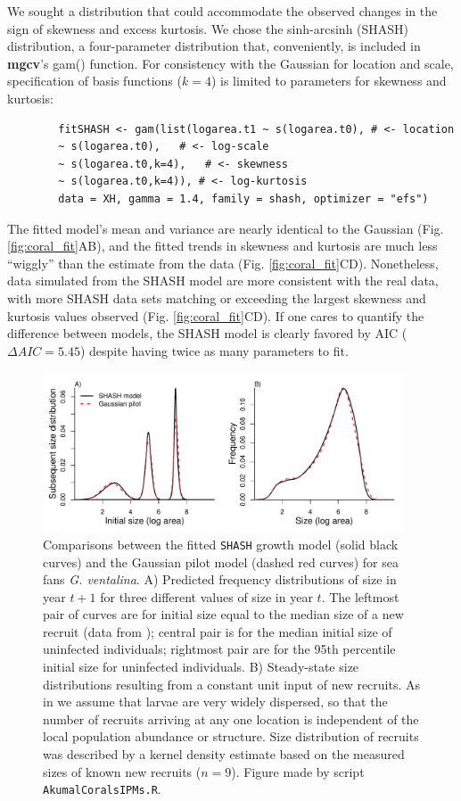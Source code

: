 \documentclass[12pt]{article}
\begin{document}
\begin{spacing}{1.35}
	We sought a distribution that could accommodate the observed changes in the sign of skewness and excess kurtosis. We chose the sinh-arcsinh (SHASH) distribution, a four-parameter distribution that, 
	conveniently, is included in \textbf{mgcv}'s gam() function. 
	For consistency with the Gaussian for location and scale, specification of basis functions ($k=4$) is limited to parameters for skewness and kurtosis:
	\begin{lstlisting}
		fitSHASH <- gam(list(logarea.t1 ~ s(logarea.t0), # <- location 
		~ s(logarea.t0),   # <- log-scale
		~ s(logarea.t0,k=4),   # <- skewness
		~ s(logarea.t0,k=4)), # <- log-kurtosis
		data = XH, gamma = 1.4, family = shash, optimizer = "efs")
	\end{lstlisting}
	The fitted model's mean and variance are nearly identical to the Gaussian (Fig. \ref{fig:coral_fit}AB), and the fitted trends in skewness and kurtosis are much less ``wiggly'' than the estimate from the data (Fig. \ref{fig:coral_fit}CD). 
	Nonetheless, data simulated from the SHASH model are more consistent with the real data, with more SHASH data sets matching or exceeding the largest skewness and kurtosis values observed (Fig. \ref{fig:coral_fit}CD). 
	If one cares to quantify the difference between models, the SHASH model is clearly favored by AIC ($\Delta AIC = 5.45$) despite having twice as many parameters to fit. 
	
	\begin{figure}[tbp]
		\centering
		\includegraphics[width=0.95\textwidth]{figures/CoralKernelCompare_v2.pdf}
		\caption{Comparisons between the fitted \texttt{SHASH} growth model (solid black curves) and the Gaussian pilot model (dashed red curves)
			for sea fans \emph{G. ventalina}. A) Predicted frequency distributions of size in year $t+1$ for three different values of size in 
			year $t$. The leftmost pair of curves are for initial size equal to the median size of a new recruit (data from \citep{bruno-etal-2011}); 
			central pair is for the median initial size of uninfected individuals; rightmost pair are for the 95th percentile initial size for uninfected
			individuals. B) Steady-state size distributions resulting from a constant unit input of new recruits. As in \citet{bruno-etal-2011} we
			assume that larvae are very widely dispersed, so that the number of recruits arriving at any one location is independent of the local population
			abundance or structure. Size distribution of recruits was described by a kernel density estimate based on the measured sizes
			of known new recruits ($n=9$). Figure made by script \texttt{AkumalCoralsIPMs.R}.}
		\label{fig:CoralKernelCompare}
	\end{figure}   
	

\end{spacing}
\end{document}
